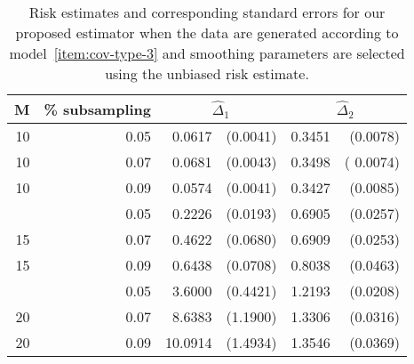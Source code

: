 \begin{table}[H] \label{table:simulation-2-sigma-3}
\centering
\begin{tabular}{rrrrrr}
M & \% subsampling &  \multicolumn{2}{c}{$\hat{\Delta}_1$}  &  \multicolumn{2}{c}{$\hat{\Delta}_2$} \\  
  \hline
10 & 0.05 & 0.0617 & (0.0041) & 0.3451 & (0.0078) \\ 
  10 & 0.07 & 0.0681 & (0.0043) & 0.3498 &( 0.0074) \\ 
  10 & 0.09 & 0.0574 & (0.0041) & 0.3427 & (0.0085) \\ 
    \hdashline
  15 & 0.05 & 0.2226 & (0.0193) & 0.6905 & (0.0257) \\ 
  15 & 0.07 & 0.4622 & (0.0680) & 0.6909 & (0.0253) \\ 
  15 & 0.09 & 0.6438 & (0.0708) & 0.8038 & (0.0463) \\ 
    \hdashline
  20 & 0.05 & 3.6000 & (0.4421) & 1.2193 & (0.0208) \\ 
  20 & 0.07 & 8.6383 & (1.1900) & 1.3306 & (0.0316) \\ 
  20 & 0.09 & 10.0914 & (1.4934) & 1.3546 & (0.0369) \\ 
   \hline
\end{tabular}
\caption{Risk estimates and corresponding standard errors for our proposed estimator when the data are generated according to model~\ref{item:cov-type-3}  and smoothing parameters are selected using the unbiased risk estimate.} 
\end{table}


